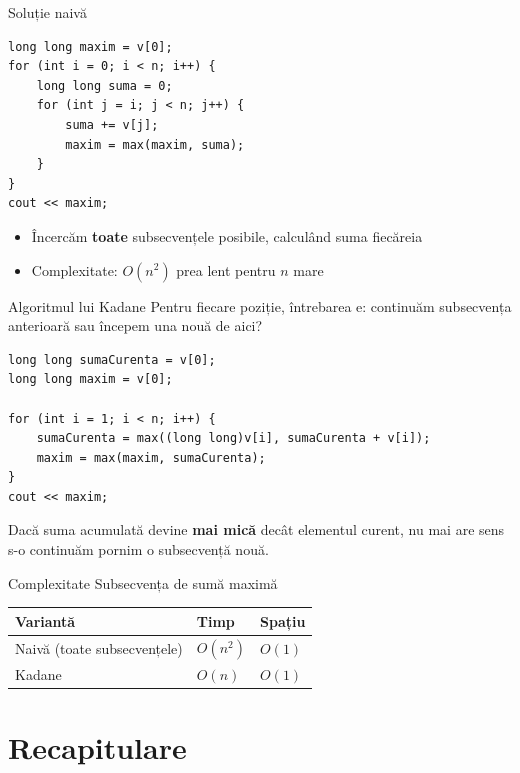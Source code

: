 \documentclass{beamer}
\begin{document}
\begin{frame}[fragile]{Soluție naivă}
  \begin{lstlisting}
long long maxim = v[0];
for (int i = 0; i < n; i++) {
    long long suma = 0;
    for (int j = i; j < n; j++) {
        suma += v[j];
        maxim = max(maxim, suma);
    }
}
cout << maxim;
  \end{lstlisting}
  \begin{itemize}
    \item Încercăm \textbf{toate} subsecvențele posibile, calculând suma fiecăreia
    \item Complexitate: $O(n^2)$ \textemdash{} prea lent pentru $n$ mare
  \end{itemize}
\end{frame}

\begin{frame}[fragile]{Algoritmul lui Kadane}
  Pentru fiecare poziție, întrebarea e: continuăm subsecvența anterioară sau începem una nouă de aici?
  \begin{lstlisting}
long long sumaCurenta = v[0];
long long maxim = v[0];

for (int i = 1; i < n; i++) {
    sumaCurenta = max((long long)v[i], sumaCurenta + v[i]);
    maxim = max(maxim, sumaCurenta);
}
cout << maxim;
  \end{lstlisting}
  Dacă suma acumulată devine \textbf{mai mică} decât elementul curent, nu mai are sens s-o continuăm \textemdash{} pornim o subsecvență nouă.
\end{frame}

\begin{frame}{Complexitate \textemdash{} Subsecvența de sumă maximă}
  \begin{center}
  \begin{tabular}{lll}
    \toprule
    Variantă & Timp & Spațiu \\
    \midrule
    Naivă (toate subsecvențele) & $O(n^2)$ & $O(1)$ \\
    Kadane                      & $O(n)$   & $O(1)$ \\
    \bottomrule
  \end{tabular}
  \end{center}
\end{frame}

\section{Recapitulare}
\end{document}
